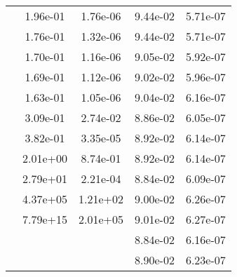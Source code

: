 \begin{table}
\begin{tabular}{c|cc|cc|}
\multicolumn{1}{|c|}{} & \multicolumn{1}{|c|}{  1.96e-01} & \multicolumn{1}{|c|}{  1.76e-06} & \multicolumn{1}{|c|}{  9.44e-02} & \multicolumn{1}{|c|}{  5.71e-07} \\ 
\multicolumn{1}{|c|}{} & \multicolumn{1}{|c|}{  1.76e-01} & \multicolumn{1}{|c|}{  1.32e-06} & \multicolumn{1}{|c|}{  9.44e-02} & \multicolumn{1}{|c|}{  5.71e-07} \\ 
\multicolumn{1}{|c|}{} & \multicolumn{1}{|c|}{  1.70e-01} & \multicolumn{1}{|c|}{  1.16e-06} & \multicolumn{1}{|c|}{  9.05e-02} & \multicolumn{1}{|c|}{  5.92e-07} \\ 
\multicolumn{1}{|c|}{} & \multicolumn{1}{|c|}{  1.69e-01} & \multicolumn{1}{|c|}{  1.12e-06} & \multicolumn{1}{|c|}{  9.02e-02} & \multicolumn{1}{|c|}{  5.96e-07} \\ 
\multicolumn{1}{|c|}{} & \multicolumn{1}{|c|}{  1.63e-01} & \multicolumn{1}{|c|}{  1.05e-06} & \multicolumn{1}{|c|}{  9.04e-02} & \multicolumn{1}{|c|}{  6.16e-07} \\ 
\multicolumn{1}{|c|}{} & \multicolumn{1}{|c|}{  3.09e-01} & \multicolumn{1}{|c|}{  2.74e-02} & \multicolumn{1}{|c|}{  8.86e-02} & \multicolumn{1}{|c|}{  6.05e-07} \\ 
\multicolumn{1}{|c|}{} & \multicolumn{1}{|c|}{  3.82e-01} & \multicolumn{1}{|c|}{  3.35e-05} & \multicolumn{1}{|c|}{  8.92e-02} & \multicolumn{1}{|c|}{  6.14e-07} \\ 
\multicolumn{1}{|c|}{} & \multicolumn{1}{|c|}{  2.01e+00} & \multicolumn{1}{|c|}{  8.74e-01} & \multicolumn{1}{|c|}{  8.92e-02} & \multicolumn{1}{|c|}{  6.14e-07} \\ 
\multicolumn{1}{|c|}{} & \multicolumn{1}{|c|}{  2.79e+01} & \multicolumn{1}{|c|}{  2.21e-04} & \multicolumn{1}{|c|}{  8.84e-02} & \multicolumn{1}{|c|}{  6.09e-07} \\ 
\multicolumn{1}{|c|}{} & \multicolumn{1}{|c|}{  4.37e+05} & \multicolumn{1}{|c|}{  1.21e+02} & \multicolumn{1}{|c|}{  9.00e-02} & \multicolumn{1}{|c|}{  6.26e-07} \\ 
\multicolumn{1}{|c|}{} & \multicolumn{1}{|c|}{  7.79e+15} & \multicolumn{1}{|c|}{  2.01e+05} & \multicolumn{1}{|c|}{  9.01e-02} & \multicolumn{1}{|c|}{  6.27e-07} \\ 
\multicolumn{1}{|c|}{} & \multicolumn{1}{|c|}{} & \multicolumn{1}{|c|}{} & \multicolumn{1}{|c|}{  8.84e-02} & \multicolumn{1}{|c|}{  6.16e-07} \\ 
\multicolumn{1}{|c|}{} & \multicolumn{1}{|c|}{} & \multicolumn{1}{|c|}{} & \multicolumn{1}{|c|}{  8.90e-02} & \multicolumn{1}{|c|}{  6.23e-07} \\ 

\end{tabular}
\end{table}
